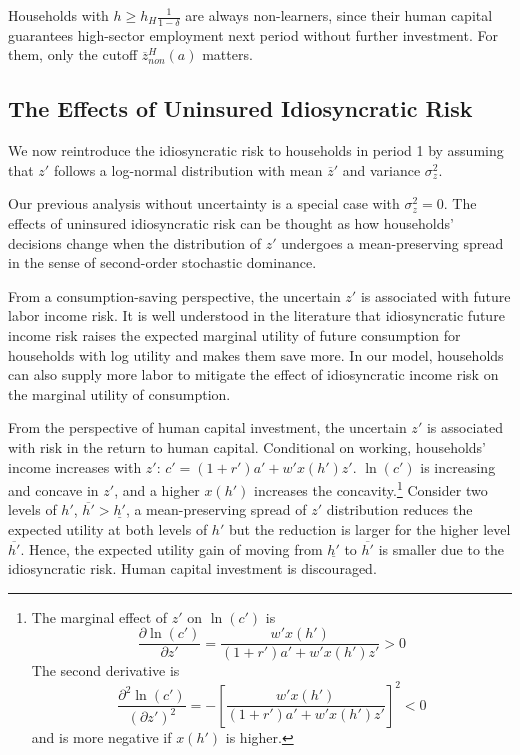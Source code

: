 \documentclass[12pt,english]{article}
\numberwithin{equation}{section}
\begin{document}
\bigskip
\noindent
Households with $h \geq h_H\frac{1}{1-\delta}$ are always non-learners, since their human capital guarantees high-sector employment next period without further investment. For them, only the cutoff $\overline{z}^H_{non}(a)$ matters.







\subsection{The Effects of Uninsured Idiosyncratic Risk}
We now reintroduce the idiosyncratic risk to households in period 1 by assuming that $z'$ follows a log-normal distribution with mean $\overline{z}'$ and variance $\sigma^2_z$. 

Our previous analysis without uncertainty is a special case with $\sigma^2_z=0$. The effects of uninsured idiosyncratic risk can be thought as how households' decisions change when the distribution of $z'$ undergoes a mean-preserving spread in the sense of second-order stochastic dominance.

From a consumption-saving perspective, the uncertain $z'$ is associated with future labor income risk. It is well understood in the literature that idiosyncratic future income risk raises the expected marginal utility of future consumption for households with log utility and makes them save more. In our model, households can also supply more labor to mitigate the effect of idiosyncratic income risk on the marginal utility of consumption. 

From the perspective of human capital investment, the uncertain $z'$ is associated with risk in the return to human capital. Conditional on working, households' income increases with $z'$: $c'=(1+r')a'+w'x(h')z'$. $\ln(c')$ is increasing and concave in $z'$, and a higher $x(h')$ increases the concavity.\footnote{The marginal effect of $z'$ on $\ln(c')$ is 
\begin{equation*}
    \frac{\partial\ln(c')}{\partial z'}=\frac{w'x(h')}{(1+r')a'+w'x(h')z'} > 0
\end{equation*}
The second derivative is 
\begin{equation*}
    \frac{\partial^2\ln(c')}{(\partial z')^2}=-\left[\frac{w'x(h')}{(1+r')a'+w'x(h')z'}\right]^2 <0
\end{equation*}
and is more negative if $x(h')$ is higher.} Consider two levels of $h'$, $\overline{h'}>\underline{h'}$, a mean-preserving spread of $z'$ distribution reduces the expected utility at both levels of $h'$ but the reduction is larger for the higher level $\overline{h'}$. Hence, the expected utility gain of moving from $\underline{h'}$ to $\overline{h'}$ is smaller due to the idiosyncratic risk. Human capital investment is discouraged.
\end{document}
